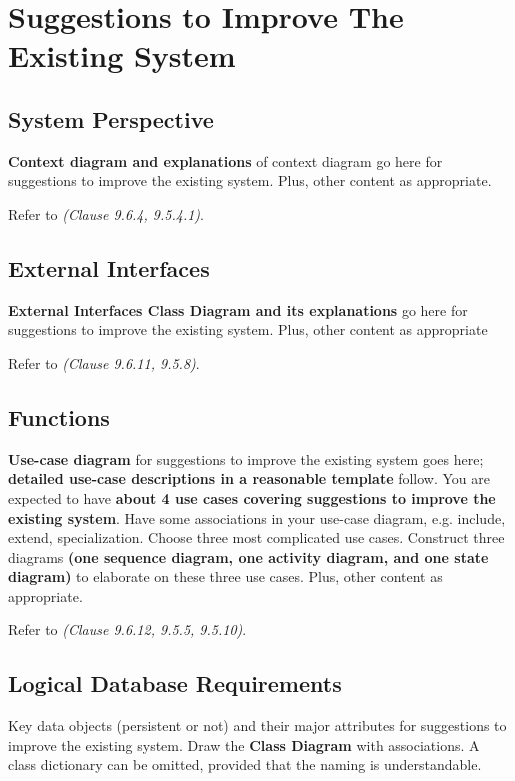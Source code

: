 \chapter{Suggestions to Improve The Existing System} \label{suggestions}

\section{System Perspective}

\textbf{Context diagram and explanations} of context diagram go here for suggestions to improve the existing system. Plus, other content as appropriate.

Refer to \textit{(Clause 9.6.4, 9.5.4.1)}.


\section{External Interfaces}

\textbf{External Interfaces Class Diagram and its explanations} go here for suggestions to improve the existing system. Plus, other content as appropriate

Refer to \textit{(Clause 9.6.11, 9.5.8)}.

\section{Functions}

\textbf{Use-case diagram} for suggestions to improve the existing system goes here; \textbf{detailed use-case descriptions in a reasonable template} follow. You are expected to have \textbf{about 4 use cases covering suggestions to improve the existing system}. Have some associations in your use-case diagram, e.g. include, extend, specialization. Choose three most complicated use cases. Construct three diagrams \textbf{(one sequence diagram, one activity diagram, and one state diagram)} to elaborate on these three use cases. Plus, other content as appropriate.

Refer to \textit{(Clause 9.6.12, 9.5.5, 9.5.10)}.

\section{Logical Database Requirements}

Key data objects (persistent or not) and their major attributes for suggestions to improve the existing system. Draw the \textbf{Class Diagram} with associations. A class dictionary can be omitted, provided that the naming is understandable.

